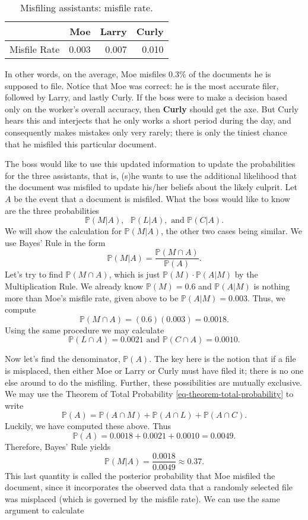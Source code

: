 \begin{table}[htb]
\caption[Misfiling assistants: misfile rate]{Misfiling assistants: misfile rate.}
\centering
\begin{tabular}{lrrr}
 & Moe & Larry & Curly\\
\hline
Misfile Rate & 0.003 & 0.007 & 0.010\\
\end{tabular}
\end{table}

In other words, on the average, Moe misfiles 0.3\% of the documents he
is supposed to file. Notice that Moe was correct: he is the most
accurate filer, followed by Larry, and lastly Curly. If the boss were
to make a decision based only on the worker's overall accuracy,
then \textbf{Curly} should get the axe. But Curly hears this and interjects
that he only works a short period during the day, and consequently
makes mistakes only very rarely; there is only the tiniest chance that
he misfiled this particular document.

The boss would like to use this updated information to update the
probabilities for the three assistants, that is, (s)he wants to use
the additional likelihood that the document was misfiled to update
his/her beliefs about the likely culprit. Let \(A\) be the event that
a document is misfiled. What the boss would like to know are the three
probabilities
\[
\mathbb{P}(M|A),\mbox{ }\mathbb{P}(L|A),\mbox{ and }\mathbb{P}(C|A).
\]
We will show the calculation for \(\mathbb{P}(M|A)\), the other two
cases being similar. We use Bayes' Rule in the form
\[
\mathbb{P}(M|A)=\frac{\mathbb{P}(M\cap A)}{\mathbb{P}(A)}.
\]
Let's try to find \(\mathbb{P}(M\cap A)\), which is just
\(\mathbb{P}(M)\cdot\mathbb{P}(A|M)\) by the Multiplication Rule. We
already know \(\mathbb{P}(M)=0.6\) and \(\mathbb{P}(A|M)\) is nothing
more than Moe's misfile rate, given above to be
\(\mathbb{P}(A|M)=0.003\). Thus, we compute
\[
\mathbb{P}(M\cap A)=(0.6)(0.003)=0.0018.
\]
Using the same procedure we may calculate
\[
\mathbb{P}(L \cap A)=0.0021\mbox{ and }\mathbb{P}(C \cap A)=0.0010.
\]

Now let's find the denominator, \(\mathbb{P}(A)\). The key here is the
notion that if a file is misplaced, then either Moe or Larry or Curly
must have filed it; there is no one else around to do the
misfiling. Further, these possibilities are mutually exclusive. We may
use the Theorem of Total Probability
\eqref{eq-theorem-total-probability} to write \[
\mathbb{P}(A)=\mathbb{P}(A\cap M)+\mathbb{P}(A\cap L)+\mathbb{P}(A\cap
C).  \] Luckily, we have computed these above. Thus \[
\mathbb{P}(A)=0.0018+0.0021+0.0010=0.0049.  \] Therefore, Bayes' Rule
yields \[ \mathbb{P}(M|A)=\frac{0.0018}{0.0049}\approx0.37.  \] This
last quantity is called the posterior probability that Moe misfiled
the document, since it incorporates the observed data that a randomly
selected file was misplaced (which is governed by the misfile
rate). We can use the same argument to calculate

